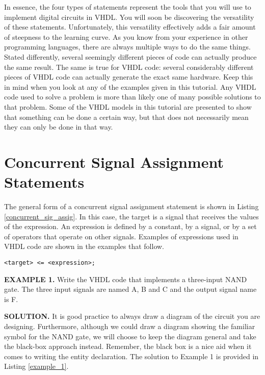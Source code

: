 In essence, the four types of statements represent the tools that you will use to implement digital circuits in VHDL. You will soon be discovering the versatility of these statements. Unfortunately, this versatility effectively adds a fair amount of steepness to the learning curve. As you know from your experience in other programming languages, there are always multiple ways to do the same things. Stated differently, several seemingly different pieces of code can actually produce the same result. The same is true for VHDL code: several considerably different pieces of VHDL code can actually generate the exact same hardware. Keep this in mind when you look at any of the examples given in this tutorial. Any VHDL code used to solve a problem is more than likely one of many possible solutions to that problem. Some of the VHDL models in this tutorial are presented to show that something can be done a certain way, but that does not necessarily mean they can only be done in that way.

\section{Concurrent Signal Assignment Statements}
The general form of a concurrent signal assignment statement is shown in Listing \ref{concurrent_sig_assig}. In this case, the target is a signal that receives the values of the expression. An expression is defined by a constant, by a signal, or by a set of operators that operate on other signals. Examples of expressions used in VHDL code are shown in the examples that follow.

\begin{lstlisting}[label=concurrent_sig_assig, caption=Syntax for the concurrent signal assignment statement.]
<target> <= <expression>;
\end{lstlisting}

\begin{leftbar}
\noindent
\textbf{EXAMPLE 1.}
Write the VHDL code that implements a three-input NAND gate. The three input signals are named A, B and C and the output signal name is F. 
\end{leftbar}
\noindent
\textbf{SOLUTION.} It is good practice to always draw a diagram of the circuit you are designing. Furthermore, although we could draw a diagram showing the familiar symbol for the NAND gate, we will choose to keep the diagram general and take the black-box approach instead. Remember, the black box is a nice aid when it comes to writing the entity declaration. The solution to Example 1 is provided in Listing \ref{example_1}.

